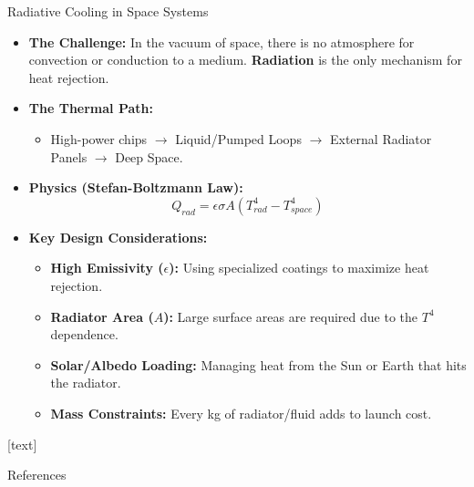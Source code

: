 \documentclass[aspectratio=169,10pt,xcolor={table,dvipsnames},t]{beamer}
\begin{document}
	\begin{frame}{Radiative Cooling in Space Systems}
		\begin{itemize}
			\item \textbf{The Challenge:} In the vacuum of space, there is no atmosphere for convection or conduction to a medium. \textbf{Radiation} is the only mechanism for heat rejection.
			\item \textbf{The Thermal Path:}
			\begin{itemize}
				\item High-power chips $\rightarrow$ Liquid/Pumped Loops $\rightarrow$ External Radiator Panels $\rightarrow$ Deep Space.
			\end{itemize}
			\item \textbf{Physics (Stefan-Boltzmann Law):}
			\begin{equation*}
				Q_{rad} = \epsilon \sigma A (T_{rad}^4 - T_{space}^4)
			\end{equation*}
			\item \textbf{Key Design Considerations:}
			\begin{itemize}
				\item \textbf{High Emissivity ($\epsilon$):} Using specialized coatings to maximize heat rejection.
				\item \textbf{Radiator Area ($A$):} Large surface areas are required due to the $T^4$ dependence.
				\item \textbf{Solar/Albedo Loading:} Managing heat from the Sun or Earth that hits the radiator.
				\item \textbf{Mass Constraints:} Every kg of radiator/fluid adds to launch cost.
			\end{itemize}
		\end{itemize}
	\end{frame}

{
[text] %
\smallframetitle
	\begin{frame}[allowframebreaks]{References}
		
		
	\end{frame}
}
\end{document}
